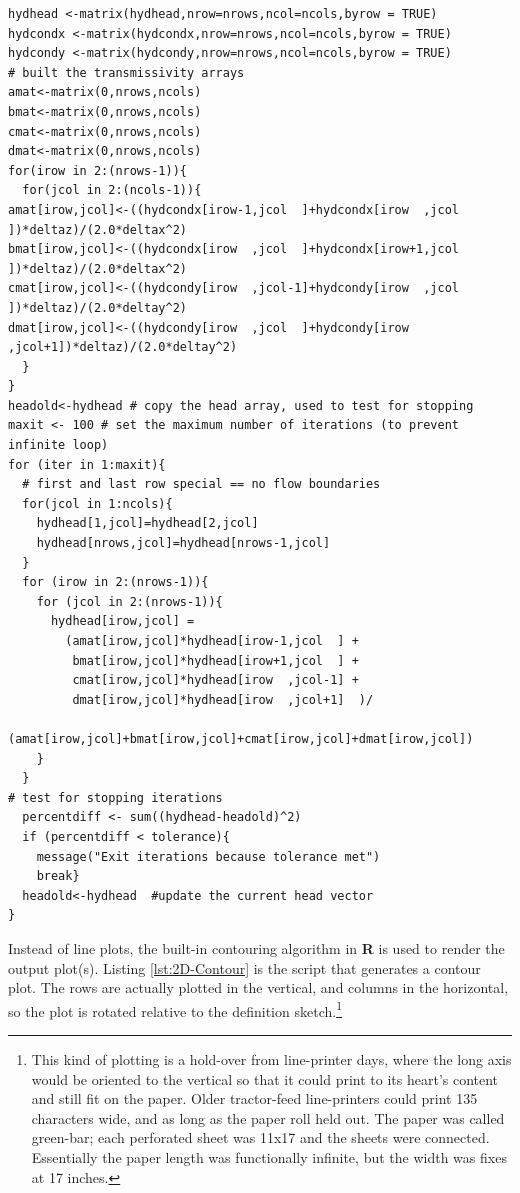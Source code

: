 \begin{lstlisting}
hydhead <-matrix(hydhead,nrow=nrows,ncol=ncols,byrow = TRUE)
hydcondx <-matrix(hydcondx,nrow=nrows,ncol=ncols,byrow = TRUE)
hydcondy <-matrix(hydcondy,nrow=nrows,ncol=ncols,byrow = TRUE)
# built the transmissivity arrays
amat<-matrix(0,nrows,ncols) 
bmat<-matrix(0,nrows,ncols) 
cmat<-matrix(0,nrows,ncols)
dmat<-matrix(0,nrows,ncols)
for(irow in 2:(nrows-1)){
  for(jcol in 2:(ncols-1)){
amat[irow,jcol]<-((hydcondx[irow-1,jcol  ]+hydcondx[irow  ,jcol  ])*deltaz)/(2.0*deltax^2)
bmat[irow,jcol]<-((hydcondx[irow  ,jcol  ]+hydcondx[irow+1,jcol  ])*deltaz)/(2.0*deltax^2)
cmat[irow,jcol]<-((hydcondy[irow  ,jcol-1]+hydcondy[irow  ,jcol  ])*deltaz)/(2.0*deltay^2)
dmat[irow,jcol]<-((hydcondy[irow  ,jcol  ]+hydcondy[irow  ,jcol+1])*deltaz)/(2.0*deltay^2)
  }
}
headold<-hydhead # copy the head array, used to test for stopping 
maxit <- 100 # set the maximum number of iterations (to prevent infinite loop)
for (iter in 1:maxit){
  # first and last row special == no flow boundaries
  for(jcol in 1:ncols){
    hydhead[1,jcol]=hydhead[2,jcol]
    hydhead[nrows,jcol]=hydhead[nrows-1,jcol]
  }
  for (irow in 2:(nrows-1)){
    for (jcol in 2:(nrows-1)){
      hydhead[irow,jcol] = 
        (amat[irow,jcol]*hydhead[irow-1,jcol  ] +
         bmat[irow,jcol]*hydhead[irow+1,jcol  ] +
         cmat[irow,jcol]*hydhead[irow  ,jcol-1] +
         dmat[irow,jcol]*hydhead[irow  ,jcol+1]  )/
        (amat[irow,jcol]+bmat[irow,jcol]+cmat[irow,jcol]+dmat[irow,jcol])
    }
  }
# test for stopping iterations
  percentdiff <- sum((hydhead-headold)^2)
  if (percentdiff < tolerance){
    message("Exit iterations because tolerance met")
    break}
  headold<-hydhead  #update the current head vector
}\end{lstlisting}
\clearpage

Instead of line plots, the built-in contouring algorithm in \textbf{R} is used to render the output plot(s).  Listing \ref{lst:2D-Contour} is the script that generates a contour plot.  The rows are actually plotted in the vertical, and columns in the horizontal, so the plot is rotated relative to the definition sketch.\footnote{This kind of plotting is a hold-over from line-printer days, where the long axis would be oriented to the vertical so that it could print to its heart's content and still fit on the paper. Older tractor-feed line-printers could print 135 characters wide, and as long as the paper roll held out.  The paper was called green-bar; each perforated sheet was 11x17 and the sheets were connected.  Essentially the paper length was functionally infinite, but the width was fixes at 17 inches.}

